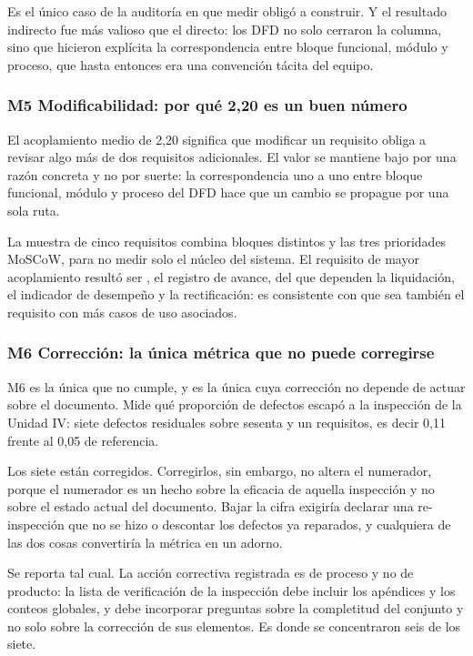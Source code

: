 Es el único caso de la auditoría en que medir obligó a construir. Y el resultado indirecto fue más
valioso que el directo: los DFD no solo cerraron la columna, sino que hicieron explícita la
correspondencia entre bloque funcional, módulo y proceso, que hasta entonces era una convención
tácita del equipo.

\subsubsection*{M5 Modificabilidad: por qué 2,20 es un buen número}

El acoplamiento medio de 2,20 significa que modificar un requisito obliga a revisar algo más de dos
requisitos adicionales. El valor se mantiene bajo por una razón concreta y no por suerte: la
correspondencia uno a uno entre bloque funcional, módulo y proceso del DFD hace que un cambio se
propague por una sola ruta.

La muestra de cinco requisitos combina bloques distintos y las tres prioridades MoSCoW, para no medir
solo el núcleo del sistema. El requisito de mayor acoplamiento resultó ser , el registro de
avance, del que dependen la liquidación, el indicador de desempeño y la rectificación: es
consistente con que sea también el requisito con más casos de uso asociados.

\subsubsection*{M6 Corrección: la única métrica que no puede corregirse}

M6 es la única que no cumple, y es la única cuya corrección no depende de actuar sobre el documento.
Mide qué proporción de defectos escapó a la inspección de la Unidad IV: siete defectos residuales
sobre sesenta y un requisitos, es decir 0,11 frente al 0,05 de referencia.

Los siete están corregidos. Corregirlos, sin embargo, no altera el numerador, porque el numerador es
un hecho sobre la eficacia de aquella inspección y no sobre el estado actual del documento. Bajar la
cifra exigiría declarar una re-inspección que no se hizo o descontar los defectos ya reparados, y
cualquiera de las dos cosas convertiría la métrica en un adorno.

Se reporta tal cual. La acción correctiva registrada es de proceso y no de producto: la lista de
verificación de la inspección debe incluir los apéndices y los conteos globales, y debe incorporar
preguntas sobre la completitud del conjunto y no solo sobre la corrección de sus elementos. Es donde
se concentraron seis de los siete.

